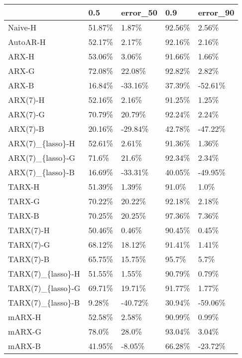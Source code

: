 \begin{tabular}{lllll}
\toprule
{} &     0.5 & error\_50 &     0.9 & error\_90 \\
\midrule
Naive-H           &  51.87\% &    1.87\% &  92.56\% &    2.56\% \\
AutoAR-H          &  52.17\% &    2.17\% &  92.16\% &    2.16\% \\
ARX-H             &  53.06\% &    3.06\% &  91.66\% &    1.66\% \\
ARX-G             &  72.08\% &   22.08\% &  92.82\% &    2.82\% \\
ARX-B             &  16.84\% &  -33.16\% &  37.39\% &  -52.61\% \\
ARX(7)-H          &  52.16\% &    2.16\% &  91.25\% &    1.25\% \\
ARX(7)-G          &  70.79\% &   20.79\% &  92.24\% &    2.24\% \\
ARX(7)-B          &  20.16\% &  -29.84\% &  42.78\% &  -47.22\% \\
ARX(7)\_\{lasso\}-H  &  52.61\% &    2.61\% &  91.36\% &    1.36\% \\
ARX(7)\_\{lasso\}-G  &   71.6\% &    21.6\% &  92.34\% &    2.34\% \\
ARX(7)\_\{lasso\}-B  &  16.69\% &  -33.31\% &  40.05\% &  -49.95\% \\
TARX-H            &  51.39\% &    1.39\% &   91.0\% &     1.0\% \\
TARX-G            &  70.22\% &   20.22\% &  92.18\% &    2.18\% \\
TARX-B            &  70.25\% &   20.25\% &  97.36\% &    7.36\% \\
TARX(7)-H         &  50.46\% &    0.46\% &  90.45\% &    0.45\% \\
TARX(7)-G         &  68.12\% &   18.12\% &  91.41\% &    1.41\% \\
TARX(7)-B         &  65.75\% &   15.75\% &   95.7\% &     5.7\% \\
TARX(7)\_\{lasso\}-H &  51.55\% &    1.55\% &  90.79\% &    0.79\% \\
TARX(7)\_\{lasso\}-G &  69.71\% &   19.71\% &  91.77\% &    1.77\% \\
TARX(7)\_\{lasso\}-B &   9.28\% &  -40.72\% &  30.94\% &  -59.06\% \\
mARX-H            &  52.58\% &    2.58\% &  90.99\% &    0.99\% \\
mARX-G            &   78.0\% &    28.0\% &  93.04\% &    3.04\% \\
mARX-B            &  41.95\% &   -8.05\% &  66.28\% &  -23.72\% \\

\end{tabular}
